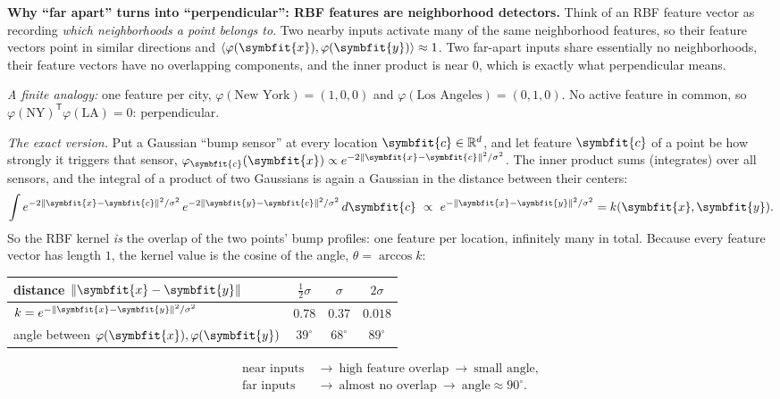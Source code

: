 \documentclass[11pt]{article}
\newcommand{\bm}[1]{\symbfit{#1}}
\newcommand{\R}{\mathbb{R}}
\newcommand{\vx}{\bm{x}}
\newcommand{\T}{^{\mathsf T}}
\newcommand{\norm}[1]{\left\lVert #1\right\rVert}
\begin{document}
\begin{intuition}
\textbf{Why ``far apart'' turns into ``perpendicular'': RBF features are neighborhood detectors.} Think of an RBF feature vector
as recording \emph{which neighborhoods a point belongs to}. Two nearby inputs activate many of the same neighborhood
features, so their feature vectors point in similar directions and $\langle\varphi(\vx),\varphi(\bm y)\rangle\approx1$. Two far-apart inputs share
essentially no neighborhoods, their feature vectors have no overlapping components, and the inner product is near $0$,
which is exactly what perpendicular means.

\emph{A finite analogy:} one feature per city, $\varphi(\text{New York})=(1,0,0)$ and $\varphi(\text{Los Angeles})=(0,1,0)$. No active feature in common, so
$\varphi(\text{NY})\T\varphi(\text{LA})=0$: perpendicular.

\emph{The exact version.} Put a Gaussian ``bump sensor'' at every location $\bm c\in\R^d$, and let feature $\bm c$ of a point be how
strongly it triggers that sensor, $\varphi_{\bm c}(\vx)\propto e^{-2\norm{\vx-\bm c}^2/\sigma^2}$. The inner product sums (integrates) over all sensors, and
the integral of a product of two Gaussians is again a Gaussian in the distance between their centers:
\[
\int e^{-2\norm{\vx-\bm c}^2/\sigma^2}\,e^{-2\norm{\bm y-\bm c}^2/\sigma^2}\,d\bm c\ \propto\ e^{-\norm{\vx-\bm y}^2/\sigma^2}=k(\vx,\bm y).
\]
So the RBF kernel \emph{is} the overlap of the two points' bump profiles: one feature per location, infinitely many in
total. Because every feature vector has length $1$, the kernel value is the cosine of the angle, $\theta=\arccos k$:
\begin{center}
\renewcommand{\arraystretch}{1.2}
\begin{tabular}{lccc}
\toprule
distance $\norm{\vx-\bm y}$ & $\tfrac12\sigma$ & $\sigma$ & $2\sigma$ \\
\midrule
$k=e^{-\norm{\vx-\bm y}^2/\sigma^2}$ & $0.78$ & $0.37$ & $0.018$ \\
angle between $\varphi(\vx),\varphi(\bm y)$ & $39^\circ$ & $68^\circ$ & $89^\circ$ \\
\bottomrule
\end{tabular}
\end{center}
\[
\begin{aligned}
\text{near inputs}&\ \to\ \text{high feature overlap}\ \to\ \text{small angle},\\
\text{far inputs}&\ \to\ \text{almost no overlap}\ \to\ \text{angle}\approx90^\circ .
\end{aligned}
\]
\end{intuition}
\end{document}
